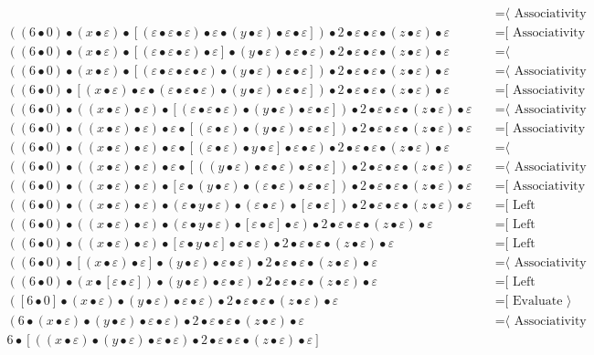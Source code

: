 \documentclass{article}
\begin{document}
\begin{align*}
  & \quad \text{=⟨ Associativity ]}\\
((6 • 0) • (x • ε) • [(ε • ε • ε) • ε • (y • ε) • ε • ε]) • 2 • ε • ε • (z • ε) • ε
  & \quad \text{=[ Associativity ⟩}\\
((6 • 0) • (x • ε) • [(ε • ε • ε) • ε] • (y • ε) • ε • ε) • 2 • ε • ε • (z • ε) • ε
  & \quad \text{=⟨ Commutativity ]}\\
((6 • 0) • (x • ε) • [(ε • ε • ε • ε) • (y • ε) • ε • ε]) • 2 • ε • ε • (z • ε) • ε
  & \quad \text{=⟨ Associativity ]}\\
((6 • 0) • [(x • ε) • ε • (ε • ε • ε) • (y • ε) • ε • ε]) • 2 • ε • ε • (z • ε) • ε
  & \quad \text{=[ Associativity ⟩}\\
((6 • 0) • ((x • ε) • ε) • [(ε • ε • ε) • (y • ε) • ε • ε]) • 2 • ε • ε • (z • ε) • ε
  & \quad \text{=⟨ Associativity ]}\\
((6 • 0) • ((x • ε) • ε) • ε • [(ε • ε) • (y • ε) • ε • ε]) • 2 • ε • ε • (z • ε) • ε
  & \quad \text{=[ Associativity ⟩}\\
((6 • 0) • ((x • ε) • ε) • ε • [(ε • ε) • y • ε] • ε • ε) • 2 • ε • ε • (z • ε) • ε
  & \quad \text{=⟨ Commutativity ]}\\
((6 • 0) • ((x • ε) • ε) • ε • [((y • ε) • ε • ε) • ε • ε]) • 2 • ε • ε • (z • ε) • ε
  & \quad \text{=⟨ Associativity ]}\\
((6 • 0) • ((x • ε) • ε) • [ε • (y • ε) • (ε • ε) • ε • ε]) • 2 • ε • ε • (z • ε) • ε
  & \quad \text{=[ Associativity ⟩}\\
((6 • 0) • ((x • ε) • ε) • (ε • y • ε) • (ε • ε) • [ε • ε]) • 2 • ε • ε • (z • ε) • ε
  & \quad \text{=[ Left neutrality ⟩}\\
((6 • 0) • ((x • ε) • ε) • (ε • y • ε) • [ε • ε] • ε) • 2 • ε • ε • (z • ε) • ε
  & \quad \text{=[ Left neutrality ⟩}\\
((6 • 0) • ((x • ε) • ε) • [ε • y • ε] • ε • ε) • 2 • ε • ε • (z • ε) • ε
  & \quad \text{=[ Left neutrality ⟩}\\
((6 • 0) • [(x • ε) • ε] • (y • ε) • ε • ε) • 2 • ε • ε • (z • ε) • ε
  & \quad \text{=⟨ Associativity ]}\\
((6 • 0) • (x • [ε • ε]) • (y • ε) • ε • ε) • 2 • ε • ε • (z • ε) • ε
  & \quad \text{=[ Left neutrality ⟩}\\
([6 • 0] • (x • ε) • (y • ε) • ε • ε) • 2 • ε • ε • (z • ε) • ε
  & \quad \text{=[ Evaluate ⟩}\\
(6 • (x • ε) • (y • ε) • ε • ε) • 2 • ε • ε • (z • ε) • ε
  & \quad \text{=⟨ Associativity ]}\\
6 • [((x • ε) • (y • ε) • ε • ε) • 2 • ε • ε • (z • ε) • ε]

\end{align*}
\end{document}
